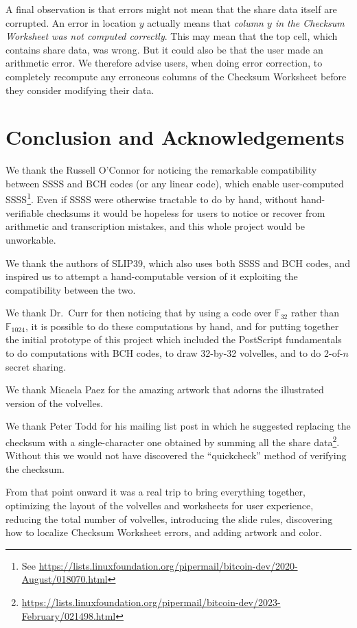 \documentclass[letterpaper]{article}
\newcommand{\fttwo}{\mathbb{F}_{32}}
\begin{document}
A final observation is that errors might not mean that the share data itself are
corrupted. An error in location $y$ actually means that \emph{column $y$ in the
Checksum Worksheet was not computed correctly}. This may mean that the top cell,
which contains share data, was wrong. But it could also be that the user made an
arithmetic error. We therefore advise users, when doing error correction, to
completely recompute any erroneous columns of the Checksum Worksheet before they
consider modifying their data.

\section{Conclusion and Acknowledgements}

We thank the Russell O'Connor for noticing the remarkable compatibility between
SSSS and BCH codes (or any linear code), which enable user-computed SSSS\footnote{
See \url{https://lists.linuxfoundation.org/pipermail/bitcoin-dev/2020-August/018070.html}}.
Even if SSSS were otherwise tractable to do by hand, without hand-verifiable checksums it
would be hopeless for users to notice or recover from arithmetic and transcription
mistakes, and this whole project would be unworkable.

We thank the authors of SLIP39, which also uses both SSSS and BCH codes, and
inspired us to attempt a hand-computable version of it exploiting the compatibility
between the two.

We thank Dr.~Curr for then noticing that by using a code over $\fttwo$
rather than $\mathbb{F}_{1024}$, it is possible to do these computations by hand,
and for putting together the initial prototype of this project which included
the PostScript fundamentals to do computations with BCH codes, to draw 32-by-32
volvelles, and to do 2-of-$n$ secret sharing.

We thank Micaela Paez for the amazing artwork that adorns the illustrated version
of the volvelles.

We thank Peter Todd for his mailing list post in which he suggested replacing the
checksum with a single-character one obtained by summing all the share data\footnote{
\url{https://lists.linuxfoundation.org/pipermail/bitcoin-dev/2023-February/021498.html}}.
Without this we would not have discovered the ``quickcheck'' method of verifying
the checksum.

From that point onward it was a real trip to bring everything together, optimizing
the layout of the volvelles and worksheets for user experience, reducing the
total number of volvelles, introducing the slide rules, discovering how to localize
Checksum Worksheet errors, and adding artwork and color.
\end{document}
